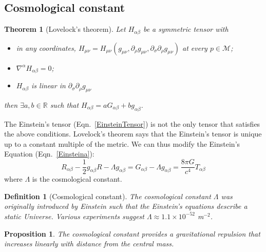 \documentclass[a4paper]{article}
\theoremstyle{new}
\newtheorem{defi}{Definition}[section]
\newtheorem{thm}{Theorem}[section]
\newtheorem{prop}{Proposition}[section]
\begin{document}
\subsection{Cosmological constant}
\begin{thm}[Lovelock's theorem]
Let $H_{\alpha\beta}$ be a symmetric tensor with
\begin{itemize}
    \item in any coordinates, $H_{\mu\nu}=H_{\mu\nu}(g_{\mu\nu},\partial_\rho g_{\mu\nu},\partial_\sigma\partial_\rho g_{\mu\nu})$ at every $p\in\mathcal{M}$;
    \item $\nabla^\alpha H_{\alpha\beta}=0$;
    \item $H_{\alpha\beta}$ is linear in $\partial_\sigma\partial_\rho g_{\mu\nu}$
\end{itemize}
then $\exists a,b\in\mathbb{R}$ such that $H_{\alpha\beta}=aG_{\alpha\beta}+bg_{\alpha\beta}$.
\end{thm}
The Einstein's tensor (Eqn.~\ref{EinsteinTensor}) is not the only tensor that satisfies the above conditions. Lovelock's theorem says that the Einstein's tensor is unique up to a constant multiple of the metric. We can thus modify the Einstein's Equation (Eqn.~\ref{Einsteina}):
\begin{equation}
R_{\alpha\beta}-\frac{1}{2}g_{\alpha\beta}R-\Lambda g_{\alpha\beta}=G_{\alpha\beta}-\Lambda g_{\alpha\beta}=\frac{8\pi G}{c^4}T_{\alpha\beta}\label{modifiedEinstein}
\end{equation}
where $\Lambda$ is the cosmological constant. 
\begin{defi}[Cosmological constant]
The cosmological constant $\Lambda$ was originally introduced by Einstein such that the Einstein's equations describe a static Universe. Various experiments suggest $\Lambda\approx 1.1\times10^{-52}$ m$^{-2}$.
\end{defi}
\begin{prop}
The cosmological constant provides a gravitational repulsion that increases linearly with distance from the central mass.
\end{prop}
\end{document}
